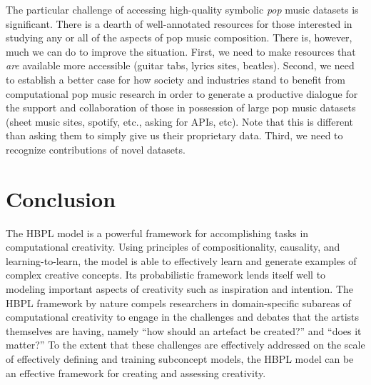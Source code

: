 \documentclass[letterpaper]{article}
\begin{document}
The particular challenge of accessing high-quality symbolic \emph{pop} music datasets is significant. There is a dearth of well-annotated resources for those interested in studying any or all of the aspects of pop music composition. There is, however, much we can do to improve the situation. First, we need to make resources that \textit{are} available more accessible (guitar tabs, lyrics sites, beatles). Second, we need to establish a better case for how society and industries stand to benefit from computational pop music research in order to generate a productive dialogue for the support and collaboration of those in possession of large pop music datasets (sheet music sites, spotify, etc., asking for APIs, etc). Note that this is different than asking them to simply give us their proprietary data. Third, we need to recognize contributions of novel datasets.

\section{Conclusion}

The HBPL model is a powerful framework for accomplishing tasks in computational creativity. Using principles of compositionality, causality, and learning-to-learn, the model is able to effectively learn and generate examples of complex creative concepts. Its probabilistic framework lends itself well to modeling important aspects of creativity such as inspiration and intention. The HBPL framework by nature compels researchers in domain-specific subareas of computational creativity to engage in the challenges and debates that the artists themselves are having, namely ``how should an artefact be created?'' and ``does it matter?'' To the extent that these challenges are effectively addressed on the scale of effectively defining and training subconcept models, the HBPL model can be an effective framework for creating and assessing creativity.



\end{document}
